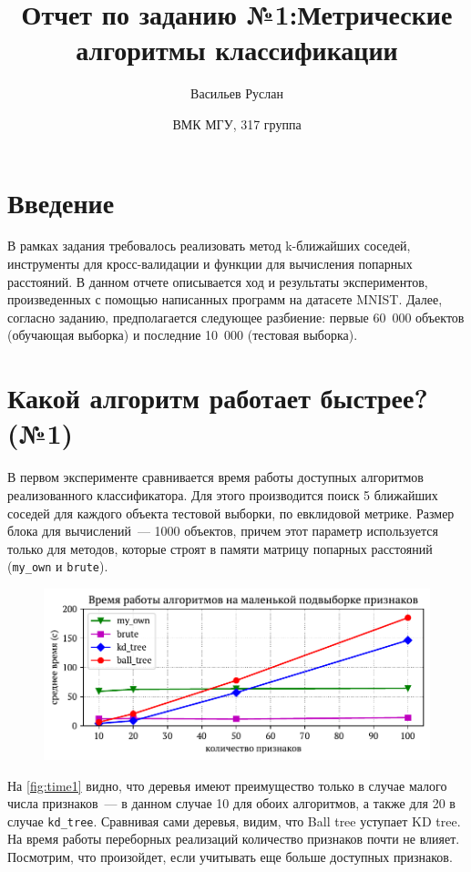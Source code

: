 \documentclass[12pt]{article}
\title{Отчет по заданию №1:\break Метрические алгоритмы классификации}
\author{Васильев Руслан \and{ВМК МГУ, 317 группа}}
\begin{document}
\maketitle
\tableofcontents

\section{Введение}
В рамках задания требовалось реализовать метод k-ближайших соседей, инструменты для кросс-валидации и функции для вычисления попарных расстояний. В данном отчете описывается ход и результаты экспериментов, произведенных с помощью написанных программ на датасете MNIST. Далее, согласно заданию, предполагается следующее разбиение: первые 60~000 объектов (обучающая выборка) и последние 10~000 (тестовая выборка).

\section{Какой алгоритм работает быстрее? (№1)}

В первом эксперименте сравнивается время работы доступных алгоритмов реализованного классификатора. Для этого производится поиск 5 ближайших соседей для каждого объекта тестовой выборки, по евклидовой метрике. Размер блока для вычислений~--- 1000 объектов, причем этот параметр используется только для методов, которые строят в памяти матрицу попарных расстояний (\verb|my_own| и \verb|brute|). 

\begin{figure}[!h]
    \includegraphics{n1_1}
    \caption{}
    \label{fig:time1}
\end{figure}


На \autoref{fig:time1} видно, что деревья имеют преимущество только в случае малого числа признаков~--- в данном случае 10 для обоих алгоритмов, а также для 20 в случае \verb|kd_tree|. Сравнивая сами деревья, видим, что Ball tree уступает KD tree. На время работы переборных реализаций количество признаков почти не влияет. Посмотрим, что произойдет, если учитывать еще больше доступных признаков.
\end{document}
